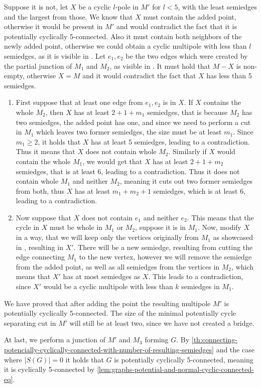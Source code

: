 \documentclass[12pt, twoside]{book}
\begin{document}
\begin{example}
	Suppose it is not, let $X$ be a cyclic $l$-pole in $M'$ for $l<5$, with the least semiedges and the largest from those. We know that $X$ must contain the added point, otherwise it would be present in $M'$ and would contradict the fact that it is potentially cyclically 5-connected. Also it must contain both neighbors of the newly added point, otherwise we could obtain a cyclic multipole with less than $l$ semiedges, as it is visible in . Let $e_1,e_2$ be the two edges which were created by the partial junction of $M_1$ and $M_2$, as visible in .  It must hold that $M-X$ is non-empty, otherwise $X=M$ and it would contradict the fact that $X$ has less than 5 semiedges.
	\begin{enumerate}
		\item First suppose that at least one edge from $e_1,e_2$ is in $X$. If $X$ contains the whole $M_2$, then $X$ has at least $2+1+m_1$ semiedges, that is because $M_2$ has two semiedges, the added point has one, and since we need to perform a cut in $M_1$ which leaves two former semiedges, the size must be at least $m_1$. Since $m_1\geq 2$, it holds that $X$ has at least 5 semiedges, leading to a contradiction. Thus it means that $X$ does not contain whole $M_2$. Similarly if $X$ would contain the whole $M_1$, we would get that $X$ has at least $2+1+m_2$ semiedges, that is at least 6, leading to a contradiction. Thus it does not contain whole $M_1$ and neither $M_2$, meaning it cuts out two former semiedges from both, thus $X$ has at least $m_1+m_2+1$ semiedges, which is at least 6, leading to a contradiction.
		\item Now suppose that $X$ does not contain $e_1$ and neither $e_2$. This means that the cycle in $X$ must be whole in $M_1$ or $M_2$, suppose it is in $M_1$. Now, modify $X$ in a way, that we will keep only the vertices originally from $M_1$ as showcased in , resulting in $X'$. There will be a new semiedge, resulting from cutting the edge connecting $M_1$ to the new vertex, however we will remove the semiedge from the added point, as well as all semiedges from the vertices in $M_2$, which means that $X'$ has at most semiedges as $X$. This leads to a contradiction, since $X'$ would be a cyclic multipole with less than $k$ semiedges in $M_1$.
	\end{enumerate}

	We have proved that after adding the point the resulting multipole $M'$ is potentially cyclically 5-connected. The size of the minimal potentially cycle separating cut in $M'$ will still be at least two, since we have not created a bridge.
	
	At last, we perform a junction of $M'$ and $M_3$ forming $G$. By \cref{th:connecting-potencially-cyclically-connected-with-number-of-resulting-semiedges} and the case where $|S(G)|=0$ it holds that $G$ is potentially cyclically 5-connected, meaning it is cyclically 5-connected by \cref{lem:graphs-potential-and-normal-cyclic-connected-eq}.
\end{example}
\end{document}
